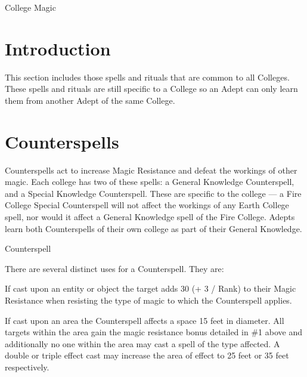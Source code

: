 \begin{Chapter}{College Magic}

\section{Introduction}

This section includes those spells and rituals that are common to all
Colleges. These spells and rituals are still specific to a College so
an Adept can only learn them from another Adept of the same College.

\section{Counterspells}
\label{college:counterspells}

Counterspells act to increase Magic Resistance and defeat the workings
of other magic.  Each college has two of these spells: a General
Knowledge Counterspell, and a Special Knowledge Counterspell.  These
are specific to the college — a Fire College Special Counterspell will
not affect the workings of any Earth College spell, nor would it
affect a General Knowledge spell of the Fire College.  Adepts learn
both Counterspells of their own college as part of their General
Knowledge.

\begin{spell}{Counterspell}
\begin{effects}
There are several distinct uses for a Counterspell. They are: 

\begin{Itemize}
  
\item If cast upon an entity or object the target adds 30 (+ 3 / Rank)
  to their Magic Resistance when resisting the type of magic to which
  the Counterspell applies.

\item If cast upon an area the Counterspell affects a space 15 feet in
  diameter.  All targets within the area gain the magic resistance
  bonus detailed in \#1 above and additionally no one within the area
  may cast a spell of the type affected. A double or triple effect
  cast may increase the area of effect to 25 feet or 35 feet
  respectively.


\end{Itemize}
\end{effects}
\end{spell}
\end{Chapter}
